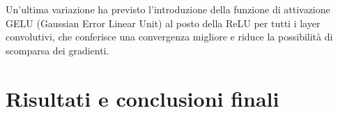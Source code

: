 \documentclass[a4paper,10pt,twocolumn]{article}
\begin{document}
Un'ultima variazione ha previsto l'introduzione della funzione di attivazione GELU (Gaussian Error Linear Unit) al posto della ReLU per tutti i layer convolutivi, che conferisce una convergenza migliore e riduce la 
possibilità di scomparsa dei gradienti.

\section{Risultati e conclusioni finali}\label{results}

\FloatBarrier

\begin{figure}[p]
  \begin{mdframed}[
      linewidth=1pt,
      innertopmargin=6pt,
      innerbottommargin=6pt,
      innerleftmargin=6pt,
      innerrightmargin=6pt
      linecolor=black,
      nobreak
    ]


\end{mdframed}
\end{figure}
\end{document}
